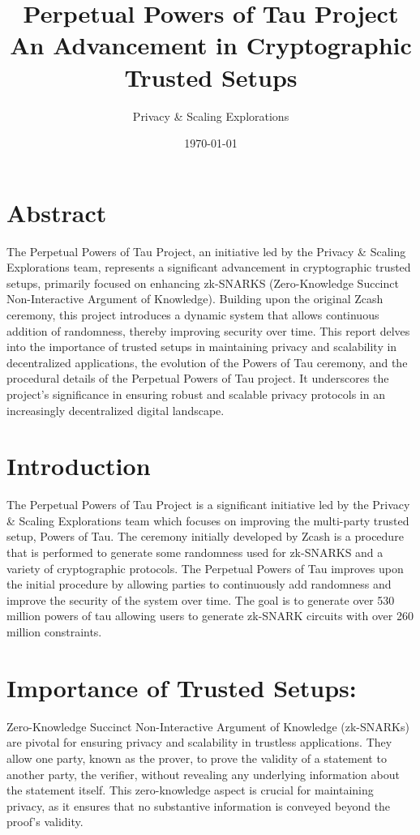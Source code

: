 \documentclass[11pt]{article}
\author{Privacy \& Scaling Explorations}
\date{\today}
\title{Perpetual Powers of Tau Project\\\medskip
\large An Advancement in Cryptographic Trusted Setups}
\begin{document}
\maketitle
\tableofcontents

\section{Abstract}
\label{sec:orge115b42}

The Perpetual Powers of Tau Project, an initiative led by the Privacy \& Scaling Explorations team, represents a significant advancement in cryptographic trusted setups, primarily focused on enhancing zk-SNARKS (Zero-Knowledge Succinct Non-Interactive Argument of Knowledge). Building upon the original Zcash ceremony, this project introduces a dynamic system that allows continuous addition of randomness, thereby improving security over time. This report delves into the importance of trusted setups in maintaining privacy and scalability in decentralized applications, the evolution of the Powers of Tau ceremony, and the procedural details of the Perpetual Powers of Tau project. It underscores the project's significance in ensuring robust and scalable privacy protocols in an increasingly decentralized digital landscape.
\section{Introduction}
\label{sec:org28974b3}

The Perpetual Powers of Tau Project is a significant initiative led by the Privacy \& Scaling Explorations team which focuses on improving the multi-party trusted setup, Powers of Tau. The ceremony initially developed by Zcash is a procedure that is performed to generate some randomness used for zk-SNARKS and a variety of cryptographic protocols. The Perpetual Powers of Tau improves upon the initial procedure by allowing parties to continuously add randomness and improve the security of the system over time. The goal is to generate over 530 million powers of tau allowing users to generate zk-SNARK circuits with over 260 million constraints.
\section{Importance of Trusted Setups:}
\label{sec:org2b6bfc2}

Zero-Knowledge Succinct Non-Interactive Argument of Knowledge (zk-SNARKs) are pivotal for ensuring privacy and scalability in trustless applications. They allow one party, known as the prover, to prove the validity of a statement to another party, the verifier, without revealing any underlying information about the statement itself. This zero-knowledge aspect is crucial for maintaining privacy, as it ensures that no substantive information is conveyed beyond the proof's validity.
\end{document}
